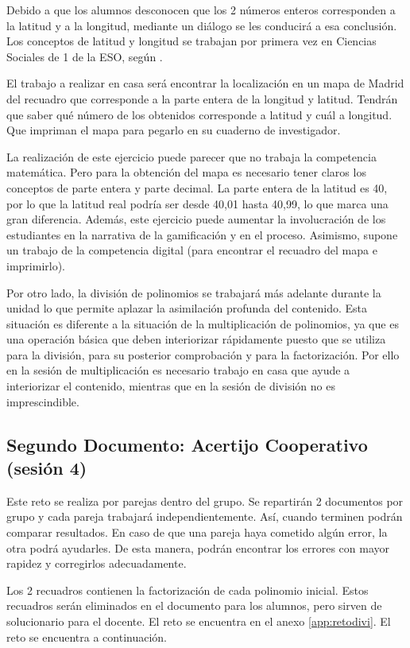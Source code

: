 Debido a que los alumnos desconocen que los 2 números enteros corresponden a la latitud y a la longitud, mediante un diálogo se les conducirá a esa conclusión.
%
Los conceptos de latitud y longitud se trabajan por primera vez en Ciencias Sociales de 1 de la ESO, según \bocm.


El trabajo a realizar en casa será encontrar la localización en un mapa de Madrid del recuadro que corresponde a la parte entera de la longitud y latitud.
%
Tendrán que saber qué número de los obtenidos corresponde a latitud y cuál a longitud.
%
Que impriman el mapa para pegarlo en su cuaderno de investigador.

\Justificacion{}
%
La realización de este ejercicio puede parecer que no trabaja la competencia matemática. 
%
Pero para la obtención del mapa es necesario tener claros los conceptos de parte entera y parte decimal.
%
La parte entera de la latitud es 40, por lo que la latitud real podría ser desde 40,01 hasta 40,99, lo que marca una gran diferencia.
%
Además, este ejercicio puede aumentar la involucración de los estudiantes en la narrativa de la gamificación y en el proceso.
%
Asimismo, supone un trabajo de la competencia digital (para encontrar el recuadro del mapa e imprimirlo).

Por otro lado, la división de polinomios se trabajará más adelante durante la unidad lo que permite aplazar la asimilación profunda del contenido.
%
Esta situación es diferente a la situación de la multiplicación de polinomios, ya que es una operación básica que deben interiorizar rápidamente puesto que se utiliza para la división, para su posterior comprobación y para la factorización.
%
Por ello en la sesión de multiplicación es necesario trabajo en casa que ayude a interiorizar el contenido, mientras que en la sesión de división no es imprescindible.


\subsection{Segundo Documento: Acertijo Cooperativo (sesión 4)}
\label{app:ses4:coop}

Este reto se realiza por parejas dentro del grupo.
%
Se repartirán 2 documentos por grupo y cada pareja trabajará independientemente. 
%
Así, cuando terminen podrán comparar resultados. 
%
En caso de que una pareja haya cometido algún error, la otra podrá ayudarles. 
%
De esta manera, podrán encontrar los errores con mayor rapidez y corregirlos adecuadamente.

Los 2 recuadros contienen la factorización de cada polinomio inicial.
%
Estos recuadros serán eliminados en el documento para los alumnos, pero sirven de solucionario para el docente.
%
\ifinapp
	El reto se encuentra en el anexo \ref{app:retodivi}.
\else 
	El reto se encuentra a continuación.
	
\fi


